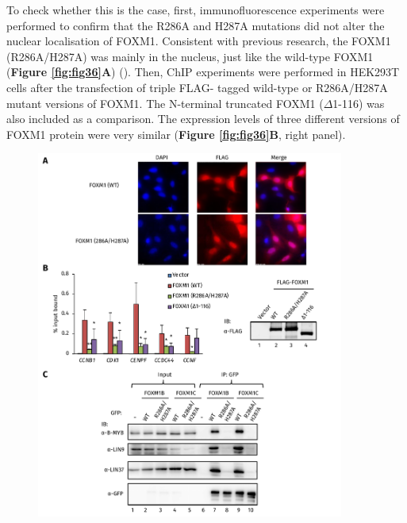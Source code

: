 To check whether this is the case, first, immunofluorescence experiments were performed to confirm that the R286A and H287A mutations did not alter the nuclear localisation of FOXM1. Consistent with previous research, the FOXM1 (R286A/H287A) was mainly in the nucleus, just like the wild-type FOXM1 (\textbf{Figure \ref{fig:fig36}A}) (\cite{zhang2011foxm1}). Then, ChIP experiments were performed in HEK293T cells after the transfection of triple FLAG- tagged wild-type or R286A/H287A mutant versions of FOXM1. The N-terminal truncated FOXM1 ($\Delta$1-116) was also included as a comparison. The expression levels of three different versions of FOXM1 protein were very similar (\textbf{Figure \ref{fig:fig36}B}, right panel).

\begin{figure}[!h]
    \centering
    \includegraphics[width=0.9\textwidth]{chapter3/figures_foxm1/fig36.pdf}

\end{figure}
